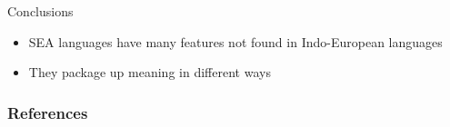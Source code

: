 \documentclass{beamer}
\begin{document}
\begin{frame}{Conclusions}
  \begin{itemize}
  \item SEA languages have many features not found in Indo-European languages
  \item They package up meaning in different ways
  \end{itemize}
\end{frame}



\begin{frame}[allowframebreaks]
        \frametitle{References}
        
        
\end{frame}
\end{document}
